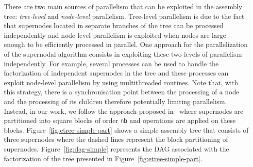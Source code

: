 \documentclass{article}
\begin{document}
There are two main sources of parallelism that can be exploited in the
assembly tree: \textit{tree-level} and
\textit{node-level} parallelism. Tree-level parallelism is due to
the fact that supernodes located in separate branches of the tree can
be processed independently and node-level parallelism is exploited
when nodes are large enough to be efficiently processed
in parallel. One approach for the parallelization of the
supernodal algorithm consists in exploiting these two levels of
parallelism independently. For example, several processes can be used
to handle the factorization of independent supernodes in the tree and
these processes can exploit node-level parallelism by using
multithreaded routines. Note that, with this strategy, there is a
synchronisation point between the processing of a node and the
processing of its children therefore potentially limiting
parallelism. Instead, in our work, we follow the approach proposed
in~\cite{h.r.s:10} where supernodes are partitioned into square blocks
of order \texttt{nb} and operations are applied on these
blocks. Figure~\ref{fig:etree-simple-part} shows a simple assembly
tree that consists of three supernodes where the dashed lines
represent the block partitioning of
supernodes. Figure~\ref{fig:dag-simple} represents the DAG associated
with the factorization of the tree presented in
Figure~\ref{fig:etree-simple-part}.
\end{document}
